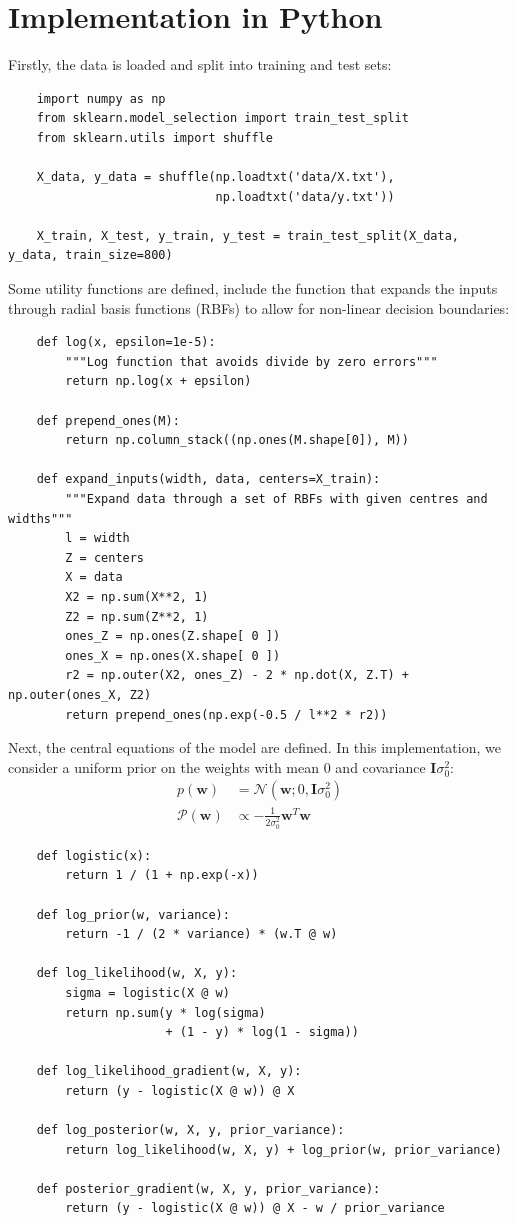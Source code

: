 \documentclass[a4paper]{article}
\begin{document}
    \section{Implementation in Python}
    Firstly, the data is loaded and split into training and test sets:
    \begin{verbatim}
    import numpy as np
    from sklearn.model_selection import train_test_split
    from sklearn.utils import shuffle

    X_data, y_data = shuffle(np.loadtxt('data/X.txt'),
                             np.loadtxt('data/y.txt'))

    X_train, X_test, y_train, y_test = train_test_split(X_data, y_data, train_size=800)
    \end{verbatim}
    Some utility functions are defined, include the function that expands the inputs through radial basis functions (RBFs) to allow for non-linear decision boundaries:
    \begin{verbatim}
    def log(x, epsilon=1e-5):
        """Log function that avoids divide by zero errors"""
        return np.log(x + epsilon)

    def prepend_ones(M):
        return np.column_stack((np.ones(M.shape[0]), M))

    def expand_inputs(width, data, centers=X_train):
        """Expand data through a set of RBFs with given centres and widths"""
        l = width
        Z = centers
        X = data
        X2 = np.sum(X**2, 1)
        Z2 = np.sum(Z**2, 1)
        ones_Z = np.ones(Z.shape[ 0 ])
        ones_X = np.ones(X.shape[ 0 ])
        r2 = np.outer(X2, ones_Z) - 2 * np.dot(X, Z.T) + np.outer(ones_X, Z2)
        return prepend_ones(np.exp(-0.5 / l**2 * r2))
    \end{verbatim}
    Next, the central equations of the model are defined. In this implementation, we consider a uniform prior on the weights with mean $0$ and covariance $\bm{I}\sigma_0^2$:
    \begin{align}
        p(\bm{w}) &= \mathcal{N}(\bm{w}; 0, \bm{I}\sigma_0^2) \label{eq:prior} \\
        \mathcal{P}(\bm{w}) &\propto -\frac{1}{2\sigma_0^2} \bm{w}^T\bm{w} \nonumber
    \end{align}
    \begin{verbatim}
    def logistic(x):
        return 1 / (1 + np.exp(-x))

    def log_prior(w, variance):
        return -1 / (2 * variance) * (w.T @ w)

    def log_likelihood(w, X, y):
        sigma = logistic(X @ w)
        return np.sum(y * log(sigma)
                      + (1 - y) * log(1 - sigma))

    def log_likelihood_gradient(w, X, y):
        return (y - logistic(X @ w)) @ X

    def log_posterior(w, X, y, prior_variance):
        return log_likelihood(w, X, y) + log_prior(w, prior_variance)

    def posterior_gradient(w, X, y, prior_variance):
        return (y - logistic(X @ w)) @ X - w / prior_variance
    \end{verbatim}
\end{document}
